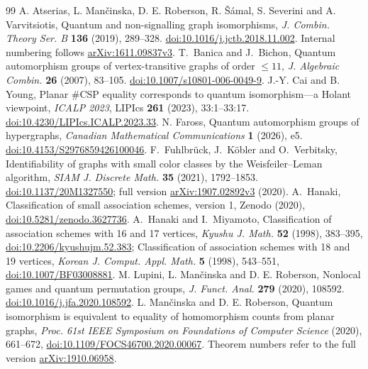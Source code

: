\documentclass[11pt,reqno]{amsart}
\numberwithin{equation}{section}
\theoremstyle{definition}
\begin{document}
\begin{thebibliography}{99}
 A. Atserias, L. Man\v{c}inska, D. E. Roberson, R. \v{S}ámal, S. Severini and A. Varvitsiotis, Quantum and non-signalling graph isomorphisms, \emph{J. Combin. Theory Ser. B} \textbf{136} (2019), 289--328. \href{https://doi.org/10.1016/j.jctb.2018.11.002}{doi:10.1016/j.jctb.2018.11.002}. Internal numbering follows \href{https://arxiv.org/abs/1611.09837v3}{arXiv:1611.09837v3}.
T.~Banica and J.~Bichon,
Quantum automorphism groups of vertex-transitive graphs of order $\le 11$,
\emph{J. Algebraic Combin.} \textbf{26} (2007), 83--105.
\href{https://doi.org/10.1007/s10801-006-0049-9}{doi:10.1007/s10801-006-0049-9}.
 J.-Y. Cai and B. Young, Planar \#CSP equality corresponds to quantum isomorphism---a Holant viewpoint, \emph{ICALP 2023}, LIPIcs \textbf{261} (2023), 33:1--33:17. \href{https://doi.org/10.4230/LIPIcs.ICALP.2023.33}{doi:10.4230/LIPIcs.ICALP.2023.33}.
 N. Faross, Quantum automorphism groups of hypergraphs, \emph{Canadian Mathematical Communications} \textbf{1} (2026), e5. \href{https://doi.org/10.4153/S2976859426100046}{doi:10.4153/S2976859426100046}.
F.~Fuhlbr\"uck, J.~K\"obler and O.~Verbitsky,
Identifiability of graphs with small color classes by the Weisfeiler--Leman algorithm, \emph{SIAM J. Discrete Math.} \textbf{35} (2021), 1792--1853. \href{https://doi.org/10.1137/20M1327550}{doi:10.1137/20M1327550}; full version \href{https://arxiv.org/abs/1907.02892v3}{arXiv:1907.02892v3} (2020).
A.~Hanaki, Classification of small association schemes, version 1,
Zenodo (2020), \href{https://doi.org/10.5281/zenodo.3627736}{doi:10.5281/zenodo.3627736}.
A.~Hanaki and I.~Miyamoto, Classification of association schemes
with 16 and 17 vertices, \emph{Kyushu J. Math.} \textbf{52} (1998), 383--395,
\href{https://doi.org/10.2206/kyushujm.52.383}{doi:10.2206/kyushujm.52.383};
Classification of association schemes with 18 and 19 vertices,
\emph{Korean J. Comput. Appl. Math.} \textbf{5} (1998), 543--551,
\href{https://doi.org/10.1007/BF03008881}{doi:10.1007/BF03008881}.
 M. Lupini, L. Man\v{c}inska and D. E. Roberson, Nonlocal games and quantum permutation groups, \emph{J. Funct. Anal.} \textbf{279} (2020), 108592. \href{https://doi.org/10.1016/j.jfa.2020.108592}{doi:10.1016/j.jfa.2020.108592}.
 L. Man\v{c}inska and D. E. Roberson, Quantum isomorphism is equivalent to equality of homomorphism counts from planar graphs, \emph{Proc. 61st IEEE Symposium on Foundations of Computer Science} (2020), 661--672, \href{https://doi.org/10.1109/FOCS46700.2020.00067}{doi:10.1109/FOCS46700.2020.00067}. Theorem numbers refer to the full version \href{https://arxiv.org/abs/1910.06958}{arXiv:1910.06958}.

\end{thebibliography}
\end{document}
